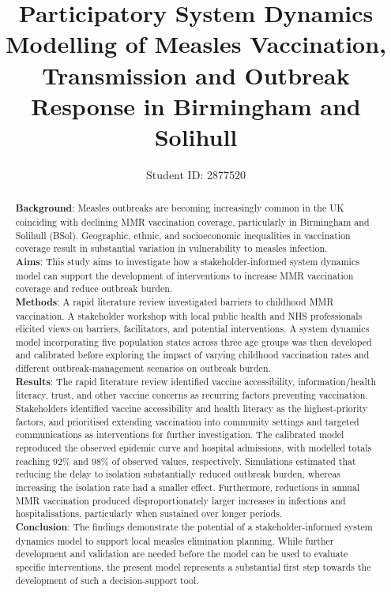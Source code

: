 \documentclass[12pt]{article}
\title{Participatory System Dynamics Modelling of Measles Vaccination, Transmission and Outbreak Response in Birmingham and Solihull}
\author{Student ID: 2877520}
\date{}
\begin{document}
\maketitle
\vspace*{-1em}
\begin{abstract}
    \noindent
    \textbf{Background}: Measles outbreaks are becoming increasingly common in the UK coinciding with declining MMR vaccination coverage, particularly in Birmingham and Solihull (BSol). Geographic, ethnic, and socioeconomic inequalities in vaccination coverage result in substantial variation in vulnerability to measles infection.\\
    \noindent
    \textbf{Aims}: This study aims to investigate how a stakeholder-informed system dynamics model can support the development of interventions to increase MMR vaccination coverage and reduce outbreak burden.\\
    \noindent
    \textbf{Methods}: A rapid literature review investigated barriers to childhood MMR vaccination. A stakeholder workshop with local public health and NHS professionals elicited views on barriers, facilitators, and potential interventions. A system dynamics model incorporating five population states across three age groups was then developed and calibrated before exploring the impact of varying childhood vaccination rates and different outbreak-management scenarios on outbreak burden.\\
    \noindent
    \textbf{Results}: The rapid literature review identified vaccine accessibility, information/health literacy, trust, and other vaccine concerns as recurring factors preventing vaccination. Stakeholders identified vaccine accessibility and health literacy as the highest-priority factors, and prioritised extending vaccination into community settings and targeted communications as interventions for further investigation. The calibrated model reproduced the observed epidemic curve and hospital admissions, with modelled totals reaching 92\% and 98\% of observed values, respectively. Simulations estimated that reducing the delay to isolation substantially reduced outbreak burden, whereas increasing the isolation rate had a smaller effect. Furthermore, reductions in annual MMR vaccination produced disproportionately larger increases in infections and hospitalisations, particularly when sustained over longer periods.\\
    \noindent
    \textbf{Conclusion}: The findings demonstrate the potential of a stakeholder-informed system dynamics model to support local measles elimination planning. While further development and validation are needed before the model can be used to evaluate specific interventions, the present model represents a substantial first step towards the development of such a decision-support tool.
    
\end{abstract}
\end{document}
